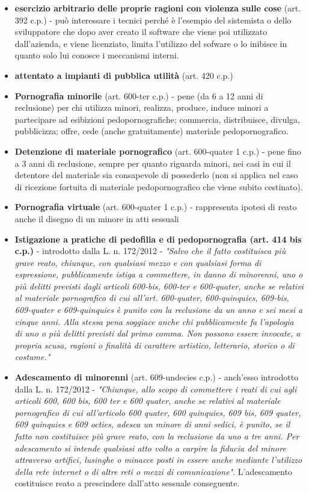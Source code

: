 \begin{itemize}
    \item \textbf{esercizio arbitrario delle proprie ragioni con violenza sulle cose} (art. 392 c.p.) - può interessare i tecnici perché è l'esempio del sistemista o dello sviluppatore che dopo aver creato il software che viene poi utilizzato dall'azienda, e viene licenziato, limita l'utilizzo del sofware o lo inibisce in quanto solo lui conosce i meccanismi interni.
    \item \textbf{attentato a impianti di pubblica utilità} (art. 420 c.p.)
    \item \textbf{Pornografia minorile} (art. 600-ter c.p.) - pene (da 6 a 12 anni di reclusione) per chi utilizza minori, realizza, produce, induce minori a partecipare ad esibizioni pedopornografiche; commercia, distribuisce, divulga, pubblicizza; offre, cede (anche gratuitamente) materiale pedopornografico.  
    \item \textbf{Detenzione di materiale pornografico} (art. 600-quater 1 c.p.) - pene fino a 3 anni di reclusione, sempre per quanto riguarda minori, nei casi in cui il detentore del materiale sia consapevole di possederlo (non si applica nel caso di ricezione fortuita di materiale pedopornografico che viene subito cestinato).
    \item \textbf{Pornografia virtuale} (art. 600-quater 1 c.p.) - rappresenta ipotesi di reato anche il disegno di un minore in atti sessuali
    \item \textbf{Istigazione a pratiche di pedofilia e di pedopornografia (art. 414 bis c.p.)} - introdotto dalla L. n. 172/2012 - \textit{"Salvo che il fatto costituisca più grave reato, chiunque, con qualsiasi mezzo e con qualsiasi forma di espressione, pubblicamente istiga a commettere, in danno di minorenni, uno o più delitti previsti dagli articoli 600-bis, 600-ter e 600-quater, anche se relativi al materiale pornografico di cui all'art. 600-quater, 600-quinquies, 609-bis, 609-quater e 609-quinquies è punito con la reclusione da un anno e sei mesi a cinque anni. Alla stessa pena soggiace anche chi pubblicamente fa l'apologia di uno o più delitti previsti dal primo comma. Non possono essere invocate, a propria scusa, ragioni o finalità di carattere artistico, letterario, storico o di costume."} 
    \item \textbf{Adescamento di minorenni} (art. 609-undecies c.p.) - anch'esso introdotto dalla L. n. 172/2012 - \textit{"Chiunque, allo scopo di commettere i reati di cui agli articoli 600, 600 bis, 600 ter e 600 quater, anche se relativi al materiale pornografico di cui all'articolo 600 quater, 600 quinquies, 609 bis, 609 quater, 609 quinquies e 609 octies, adesca un minore di anni sedici, è punito, se il fatto non costituisce più grave reato, con la reclusione da uno a tre anni. Per adescamento si intende qualsiasi atto volto a carpire la fiducia del minore attraverso artifici, lusinghe o minacce posti in essere anche mediante l'utilizzo della rete internet o di altre reti o mezzi di comunicazione"}. L'adescamento costituisce reato a prescindere dall'atto sessuale conseguente.

\end{itemize}
